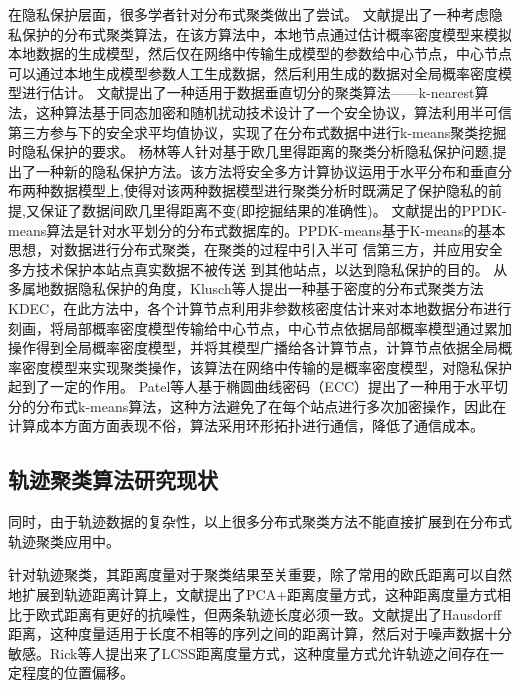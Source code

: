 在隐私保护层面，很多学者针对分布式聚类做出了尝试。
文献\cite{merugu2003privacy}提出了一种考虑隐私保护的分布式聚类算法，在该方算法中，本地节点通过估计概率密度模型来模拟本地数据的生成模型，然后仅在网络中传输生成模型的参数给中心节点，中心节点可以通过本地生成模型参数人工生成数据，然后利用生成的数据对全局概率密度模型进行估计。
文献\cite{张国荣2007分布式环境下保持隐私的聚类挖掘算法}提出了一种适用于数据垂直切分的聚类算法——k-nearest算法，这种算法基于同态加密和随机扰动技术设计了一个安全协议，算法利用半可信第三方参与下的安全求平均值协议，实现了在分布式数据中进行k-means聚类挖掘时隐私保护的要求。
杨林等人针对基于欧几里得距离的聚类分析隐私保护问题,提出了一种新的隐私保护方法。该方法将安全多方计算协议运用于水平分布和垂直分布两种数据模型上,使得对该两种数据模型进行聚类分析时既满足了保护隐私的前提,又保证了数据间欧几里得距离不变(即挖掘结果的准确性)。
文献\cite{姚瑶一种基于隐私保护的分布式聚类算法}提出的PPDK-means算法是针对水平划分的分布式数据库的。PPDK-means基于K-means的基本思想，对数据进行分布式聚类，在聚类的过程中引入半可 信第三方，并应用安全多方技术保护本站点真实数据不被传送 到其他站点，以达到隐私保护的目的。
从多属地数据隐私保护的角度，Klusch等人提出一种基于密度的分布式聚类方法KDEC，在此方法中，各个计算节点利用非参数核密度估计来对本地数据分布进行刻画，将局部概率密度模型传输给中心节点，中心节点依据局部概率模型通过累加操作得到全局概率密度模型，并将其模型广播给各计算节点，计算节点依据全局概率密度模型来实现聚类操作，该算法在网络中传输的是概率密度模型，对隐私保护起到了一定的作用。
Patel等人基于椭圆曲线密码（ECC）提出了一种用于水平切分的分布式k-means算法，这种方法避免了在每个站点进行多次加密操作，因此在计算成本方面方面表现不俗，算法采用环形拓扑进行通信，降低了通信成本。


\subsection{轨迹聚类算法研究现状}
同时，由于轨迹数据的复杂性，以上很多分布式聚类方法不能直接扩展到在分布式轨迹聚类应用中。

针对轨迹聚类，其距离度量对于聚类结果至关重要，除了常用的欧氏距离可以自然地扩展到轨迹距离计算上，文献提出了PCA+距离度量方式，这种距离度量方式相比于欧式距离有更好的抗噪性，但两条轨迹长度必须一致。文献提出了Hausdorff距离，这种度量适用于长度不相等的序列之间的距离计算，然后对于噪声数据十分敏感。Rick等人提出来了LCSS距离度量方式，这种度量方式允许轨迹之间存在一定程度的位置偏移。

